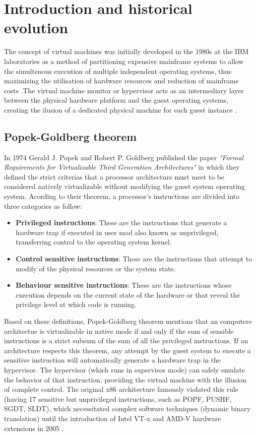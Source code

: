 \section{Introduction and historical evolution}
The concept of virtual machines was initially developed in the 1980s at the IBM laboratories as a method of partitioning expensive mainframe systems to allow the simultenous execution of multiple independent operating systems, thus maximizing the utilisation of hardware resources and reduction of mainframe costs \cite{reuben2007virtual, smith2005virtual}.The virtual machine monitor or hypervisor acts as an intermediary layer between the physical hardware platform and the guest operating systems, creating the ilusion of a dedicated physical machine for each guest instance \cite{king2003operating,smith2005virtual}.

\subsection{Popek-Goldberg theorem}
In 1974 Gerald J. Popek and Robert P. Goldberg published the paper \emph{"Formal Requirements for Virtualizable Third Generation Architectures"} \cite{popek1974formal} in which they defined the strict criterias that a processor architecture must meet to be considered natively virtualizable without modifying the guest system operating system. Acording to their theorem, a processor's instructions are divided into three categories as follow: 
    \begin{itemize}
        \item \textbf{Privileged instructions}: These are the instructions that generate a hardware trap if executed in user mod also known as unprivileged, transferring control to the operating system kernel.
        \item \textbf{Control sensitive instructions}: These are the instructions that attempt to modify of the physical resources or the system state.
        \item \textbf{Behaviour sensitive instructions}: These are the instructions whose execution depends on the current state of the hardware or that reveal the privilege level at which code is running.
    \end{itemize}

Based on these definitions, Popek-Goldberg theorem mentions that an computere architectue is virtualizable in native mode if and only if the sum of sensible instructions is a strict subsum of the sum of all the privileged instructions. If an architecture respects this theorem, any attempt by the guest system to execute a sensitive instruction will automatically generate a hardware trap in the hypervisor. The hypervisor (which runs in supervisor mode) can safely emulate the behavior of that instruction, providing the virtual machine with the illusion of complete control. The original x86 architecture famously violated this rule (having 17 sensitive but unprivileged instructions, such as POPF, PUSHF, SGDT, SLDT), which necessitated complex software techniques (dynamic binary translation) until the introduction of Intel VT-x and AMD-V hardware extensions in 2005 \cite{vm-security.pdf}.

